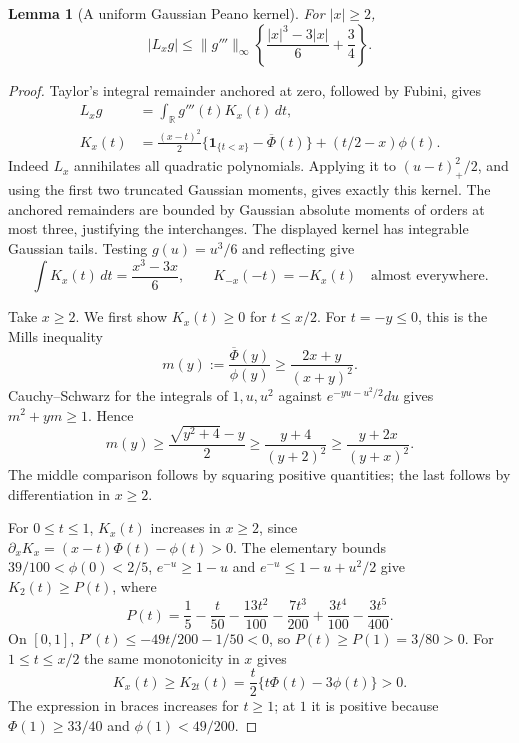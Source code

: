 \documentclass[aop,preprint]{imsart}
\newtheorem{lemma}[theorem]{Lemma}
\theoremstyle{definition}
\numberwithin{equation}{section}
\begin{document}
\begin{lemma}[A uniform Gaussian Peano kernel]\label{gc:kernel}
For $|x|\ge2$,
\begin{equation}\label{gc:kernel-bound}
 |L_xg|\le\|g'''\|_\infty
       \left\{\frac{|x|^3-3|x|}{6}+\frac34\right\}.
\end{equation}
\end{lemma}
\begin{proof}
Taylor's integral remainder anchored at zero, followed by Fubini, gives
\begin{equation}\label{gc:peano}
 \begin{aligned}
 L_xg&=\int_{\mathbb R}g'''(t)K_x(t)\,dt,\\
 K_x(t)&=\frac{(x-t)^2}{2}
       \{\mathbf1_{\{t<x\}}-\overline\Phi(t)\}+(t/2-x)\phi(t).
 \end{aligned}
\end{equation}
Indeed $L_x$ annihilates all quadratic polynomials. Applying it to
$(u-t)_+^2/2$, and using the first two truncated Gaussian moments,
gives exactly this kernel. The anchored remainders are bounded by
Gaussian absolute moments of orders at most three, justifying the
interchanges. The displayed kernel has integrable Gaussian tails.
Testing $g(u)=u^3/6$ and reflecting give
\[
 \int K_x(t)\,dt=\frac{x^3-3x}{6},\qquad
 K_{-x}(-t)=-K_x(t)\quad\text{almost everywhere}.
\]

Take $x\ge2$. We first show $K_x(t)\ge0$ for $t\le x/2$.
For $t=-y\le0$, this is the Mills inequality
\[
 m(y):=\frac{\overline\Phi(y)}{\phi(y)}
 \ge\frac{2x+y}{(x+y)^2}.
\]
Cauchy--Schwarz for the integrals of $1,u,u^2$ against
$e^{-yu-u^2/2}du$ gives $m^2+ym\ge1$. Hence
\[
 m(y)\ge\frac{\sqrt{y^2+4}-y}{2}
       \ge\frac{y+4}{(y+2)^2}
       \ge\frac{y+2x}{(y+x)^2}.
\]
The middle comparison follows by squaring positive quantities; the
last follows by differentiation in $x\ge2$.

For $0\le t\le1$, $K_x(t)$ increases in $x\ge2$, since
$\partial_xK_x=(x-t)\Phi(t)-\phi(t)>0$. The elementary bounds
$39/100<\phi(0)<2/5$, $e^{-u}\ge1-u$ and
$e^{-u}\le1-u+u^2/2$ give $K_2(t)\ge P(t)$, where
\[
 P(t)=\frac15-\frac t{50}-\frac{13t^2}{100}
       -\frac{7t^3}{200}+\frac{3t^4}{100}-\frac{3t^5}{400}.
\]
On $[0,1]$, $P'(t)\le-49t/200-1/50<0$, so
$P(t)\ge P(1)=3/80>0$.
For $1\le t\le x/2$ the same monotonicity in $x$ gives
\[
 K_x(t)\ge K_{2t}(t)
       =\frac t2\{t\Phi(t)-3\phi(t)\}>0.
\]
The expression in braces increases for $t\ge1$; at $1$ it is
positive because $\Phi(1)\ge33/40$ and $\phi(1)<49/200$.


\end{proof}
\end{document}

